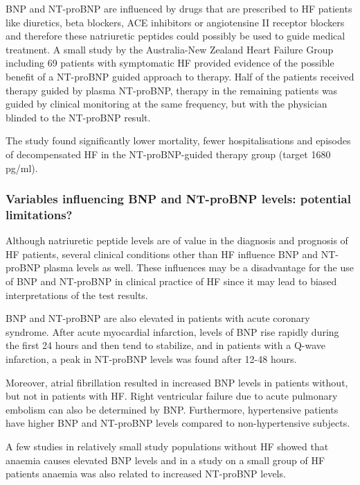 \documentclass[14pt,a4paper,onecolumn]{extarticle}
\begin{document}
BNP and NT-proBNP are influenced by drugs that are prescribed to HF patients like diuretics, beta blockers, ACE inhibitors or angiotensine II receptor blockers and therefore these natriuretic peptides could possibly be used to guide medical treatment. A small study by the Australia-New Zealand Heart Failure Group including 69 patients with symptomatic HF provided evidence of the possible benefit of a NT-proBNP guided approach to therapy. Half of the patients received therapy guided by plasma NT-proBNP, therapy in the remaining patients was guided by clinical monitoring at the same frequency, but with the physician blinded to the NT-proBNP result.

The study found significantly lower mortality, fewer hospitalisations and episodes of decompensated HF in the NT-proBNP-guided therapy group (target 1680 pg/ml). \citep{Troughton2000}



\subsubsection{Variables influencing BNP and NT-proBNP levels: potential limitations?}

Although natriuretic peptide levels are of value in the diagnosis and prognosis of HF patients, several clinical conditions other than HF influence BNP and NT-proBNP plasma levels as well. These influences may be a disadvantage for the use of BNP and NT-proBNP in clinical practice of HF since it may lead to biased interpretations of the test results.



BNP and NT-proBNP are also elevated in patients with acute coronary syndrome. After acute myocardial infarction, levels of BNP rise rapidly during the first 24 hours and then tend to stabilize, \citep{deLemos2001} and in patients with a Q-wave infarction, a peak in NT-proBNP levels was found after 12-48 hours. \citep{Talwar2000}

Moreover, atrial fibrillation resulted in increased BNP levels in patients without, but not in patients with HF. \citep{Knudsen2005} Right ventricular failure due to acute pulmonary embolism can also be determined by BNP. \citep{Tulevski2002} Furthermore, hypertensive patients have higher BNP and NT-proBNP levels compared to non-hypertensive subjects. \citep{Boomsma2001}



A few studies in relatively small study populations without HF showed that anaemia causes elevated BNP levels \citep{Tsuji2004,Willis2005,Wold2005} and in a study on a small group of HF patients anaemia was also related to increased NT-proBNP levels. \citep{Wu2005}
\end{document}
